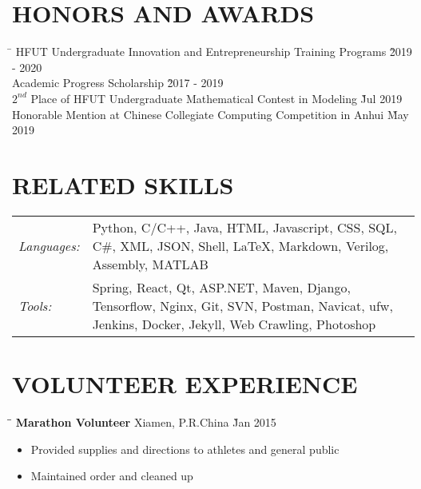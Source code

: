 \documentclass{res}
\begin{document}
\begin{resume}
\vspace{-0.15in}	    
\section{HONORS AND AWARDS}  
    \vspace{-0.1in}	
    \begin{tabbing}
    \hspace{5in}\= \kill %
    HFUT Undergraduate Innovation and Entrepreneurship Training Programs \` 2019 - 2020 \\
    Academic Progress Scholarship \` 2017 - 2019  \\
    $2^{nd}$ Place of HFUT Undergraduate Mathematical Contest in Modeling \` Jul 2019 \\
    Honorable Mention at Chinese Collegiate Computing Competition in Anhui \` May 2019 
    \end{tabbing}\vspace{-20pt}      %
   
\vspace{+0.05in}	
\section{RELATED SKILLS}  
    \vspace{+0.05in}	 
    \begin{tabular}{l p{4.6in}}
    {\sl Languages:} & Python, C/C++, Java, HTML, Javascript, CSS, 
                       SQL, C\#, XML, JSON, Shell, LaTeX, Markdown, Verilog, 
                       Assembly, MATLAB \\ 
    {\sl Tools:}  &  Spring, React, Qt, ASP.NET, Maven, Django, Tensorflow, Nginx, 
                        Git, SVN, Postman, Navicat, ufw, Jenkins, Docker, Jekyll, 
                        Web Crawling, Photoshop
    \end{tabular}   

\vspace{-0.12in}	
\section{VOLUNTEER EXPERIENCE}
    \vspace{-0.1in}
    \begin{tabbing}
    \hspace{2.3in}\= \hspace{2.6in}\= \kill %
    {\bf Marathon Volunteer} \> Xiamen, P.R.China     \` Jan 2015\\
    \end{tabbing}\vspace{-20pt}      %
    \begin{itemize} \itemsep -2pt %
    \item Provided supplies and directions to athletes and general public
    \item Maintained order and cleaned up
    \end{itemize}


\end{resume}
\end{document}
